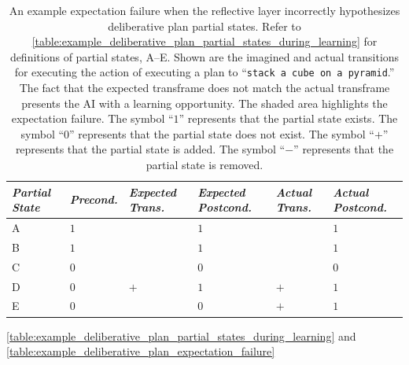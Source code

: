 \begin{table}
\centering
\begin{tabular}{p{1cm}|p{1.5cm}|p{1.5cm}p{1.5cm}|p{1.5cm}p{1.5cm}|}
{\emph{Partial State}} &{\emph{Precond.}} &{\emph{Expected Trans.}} &{\emph{Expected Postcond.}} &{\emph{Actual Trans.}} &{\emph{Actual Postcond.}} \\
\hline
A                      & $1$              &                         & $1$                        &                       & $1$                      \\
B                      & $1$              &                         & $1$                        &                       & $1$                      \\
C                      & $0$              &                         & $0$                        &                       & $0$                      \\
D                      & $0$              & $+$                     & $1$                        & $+$                   & $1$                      \\
E                      & $0$              & \cellcolor{red!10}      & \cellcolor{red!10}$0$      & \cellcolor{red!10}$+$ & \cellcolor{red!10}$1$    \\
\hline
\end{tabular}
\caption[An example expectation failure when the reflective layer
  incorrectly hypothesizes deliberative plan partial states.]{An
  example expectation failure when the reflective layer incorrectly
  hypothesizes deliberative plan partial states.  Refer to
  {\mbox{\autoref{table:example_deliberative_plan_partial_states_during_learning}}}
  for definitions of partial states, A--E.  Shown are the imagined and
  actual transitions for executing the action of executing a plan to
  ``{\tt{stack a cube on a pyramid}}.''  The fact that the expected
  transframe does not match the actual transframe presents the AI with
  a learning opportunity.  The shaded area highlights the expectation
  failure.  The symbol ``$1$'' represents that the partial state
  exists.  The symbol ``$0$'' represents that the partial state does
  not exist.  The symbol ``$+$'' represents that the partial state is
  added.  The symbol ``$-$'' represents that the partial state is
  removed.}
\label{table:example_deliberative_plan_expectation_failure}
\end{table}
{\mbox{\autoref{table:example_deliberative_plan_partial_states_during_learning}}}
and
{\mbox{\autoref{table:example_deliberative_plan_expectation_failure}}}
